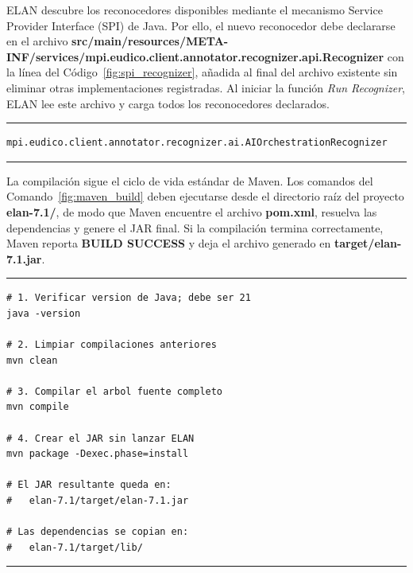 \documentclass[11pt,a4paper]{article}
\begin{document}
ELAN descubre los reconocedores disponibles mediante el mecanismo Service Provider Interface (SPI) de Java. Por ello, el nuevo reconocedor debe declararse en el archivo \textbf{src/main/resources/META-INF/services/mpi.eudico.client.annotator.recognizer.api.Recognizer} con la línea del Código~\ref{fig:spi_recognizer}, añadida al final del archivo existente sin eliminar otras implementaciones registradas. Al iniciar la función \textit{Run Recognizer}, ELAN lee este archivo y carga todos los reconocedores declarados.

\begin{center}
\begin{minipage}{0.92\textwidth}
\hrule
\vspace{0.06cm}
\scriptsize
\begin{Verbatim}[baselinestretch=0.72]
mpi.eudico.client.annotator.recognizer.ai.AIOrchestrationRecognizer
\end{Verbatim}
\vspace{0.03cm}
\hrule

\label{fig:spi_recognizer}
\end{minipage}
\end{center}

La compilación sigue el ciclo de vida estándar de Maven. Los comandos del Comando~\ref{fig:maven_build} deben ejecutarse desde el directorio raíz del proyecto \textbf{elan-7.1/}, de modo que Maven encuentre el archivo \textbf{pom.xml}, resuelva las dependencias y genere el JAR final. Si la compilación termina correctamente, Maven reporta \textbf{BUILD SUCCESS} y deja el archivo generado en \textbf{target/elan-7.1.jar}.

\begin{center}
\begin{minipage}{0.88\textwidth}
\hrule
\vspace{0.06cm}
\scriptsize
\begin{Verbatim}[baselinestretch=0.72]
# 1. Verificar version de Java; debe ser 21
java -version

# 2. Limpiar compilaciones anteriores
mvn clean

# 3. Compilar el arbol fuente completo
mvn compile

# 4. Crear el JAR sin lanzar ELAN
mvn package -Dexec.phase=install

# El JAR resultante queda en:
#   elan-7.1/target/elan-7.1.jar

# Las dependencias se copian en:
#   elan-7.1/target/lib/
\end{Verbatim}
\vspace{0.03cm}
\hrule

\label{fig:maven_build}
\end{minipage}
\end{center}
\end{document}
